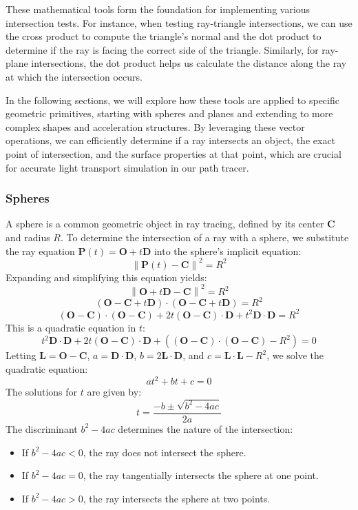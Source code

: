 \documentclass[12pt]{article}
\begin{document}
These mathematical tools form the foundation for implementing various intersection tests. For instance, when testing ray-triangle intersections, we can use the cross product to compute the triangle's normal and the dot product to determine if the ray is facing the correct side of the triangle. Similarly, for ray-plane intersections, the dot product helps us calculate the distance along the ray at which the intersection occurs.

In the following sections, we will explore how these tools are applied to specific geometric primitives, starting with spheres and planes and extending to more complex shapes and acceleration structures. By leveraging these vector operations, we can efficiently determine if a ray intersects an object, the exact point of intersection, and the surface properties at that point, which are crucial for accurate light transport simulation in our path tracer.
\subsubsection{Spheres}

A sphere is a common geometric object in ray tracing, defined by its center \(\mathbf{C}\) and radius \(R\). To determine the intersection of a ray with a sphere, we substitute the ray equation \(\mathbf{P}(t) = \mathbf{O} + t\mathbf{D}\) into the sphere's implicit equation:
\[
    \left\| \mathbf{P}(t) - \mathbf{C} \right\|^2 = R^2
\]
Expanding and simplifying this equation yields:
\[
    \left\| \mathbf{O} + t\mathbf{D} - \mathbf{C} \right\|^2 = R^2
\]
\[
    \left( \mathbf{O} - \mathbf{C} + t\mathbf{D} \right) \cdot \left( \mathbf{O} - \mathbf{C} + t\mathbf{D} \right) = R^2
\]
\[
    (\mathbf{O} - \mathbf{C}) \cdot (\mathbf{O} - \mathbf{C}) + 2t \left( \mathbf{O} - \mathbf{C} \right) \cdot \mathbf{D} + t^2 \mathbf{D} \cdot \mathbf{D} = R^2
\]
This is a quadratic equation in \(t\):
\[
    t^2 \mathbf{D} \cdot \mathbf{D} + 2t \left( \mathbf{O} - \mathbf{C} \right) \cdot \mathbf{D} + \left( (\mathbf{O} - \mathbf{C}) \cdot (\mathbf{O} - \mathbf{C}) - R^2 \right) = 0
\]
Letting \(\mathbf{L} = \mathbf{O} - \mathbf{C}\), \(a = \mathbf{D} \cdot \mathbf{D}\), \(b = 2 \mathbf{L} \cdot \mathbf{D}\), and \(c = \mathbf{L} \cdot \mathbf{L} - R^2\), we solve the quadratic equation:
\[
    at^2 + bt + c = 0
\]
The solutions for \(t\) are given by:
\[
    t = \frac{-b \pm \sqrt{b^2 - 4ac}}{2a}
\]
The discriminant \(b^2 - 4ac\) determines the nature of the intersection:
\begin{itemize}
    \item If \(b^2 - 4ac < 0\), the ray does not intersect the sphere.
    \item If \(b^2 - 4ac = 0\), the ray tangentially intersects the sphere at one point.
    \item If \(b^2 - 4ac > 0\), the ray intersects the sphere at two points.
\end{itemize}
\end{document}
